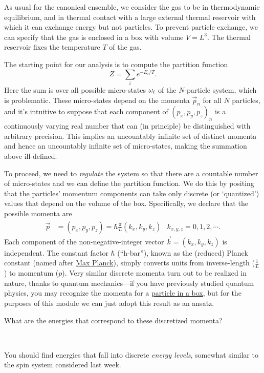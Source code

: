 As usual for the canonical ensemble, we consider the gas to be in thermodynamic equilibrium, and in thermal contact with a large external thermal reservoir with which it can exchange energy but not particles.
To prevent particle exchange, we can specify that the gas is enclosed in a box with volume $V = L^3$.
The thermal reservoir fixes the temperature $T$ of the gas.

The starting point for our analysis is to compute the partition function
\begin{equation*}
  Z = \sum_i e^{-E_i / T}.
\end{equation*}
Here the sum is over all possible micro-states $\omega_i$ of the $N$-particle system, which is problematic.
These micro-states depend on the momenta $\vec{p}_n$ for all $N$ particles, and it's intuitive to suppose that each component of $(p_x, p_y, p_z)_n$ is a continuously varying real number that can (in principle) be distinguished with arbitrary precision.
This implies an uncountably infinite set of distinct momenta and hence an uncountably infinite set of micro-states, making the summation above ill-defined.

To proceed, we need to \textit{regulate} the system so that there are a countable number of micro-states and we can define the partition function.
We do this by positing that the particles' momentum components can take only discrete (or `quantized') values that depend on the volume of the box.
Specifically, we declare that the possible momenta are
\begin{align}
  \label{eq:quant_mom}
  \vec p & = (p_x, p_y, p_z) = \hbar \frac{\pi}{L} (k_x, k_y, k_z) &
  k_{x, y, z} = 0, 1, 2, \cdots.
\end{align}
Each component of the non-negative-integer vector $\vec k = (k_x, k_y, k_z)$ is independent.
The constant factor $\hbar$ (``h-bar''), known as the (reduced) Planck constant (named after \href{https://en.wikipedia.org/wiki/Max_Planck}{Max Planck}), simply converts units from inverse-length ($\frac{1}{L}$) to momentum ($p$).
Very similar discrete momenta turn out to be realized in nature, thanks to quantum mechanics---if you have previously studied quantum physics, you may recognize the momenta for a \href{https://en.wikipedia.org/wiki/Particle_in_a_box}{particle in a box}, but for the purposes of this module we can just adopt this result as an ansatz.

What are the energies that correspond to these discretized momenta?
\begin{mdframed}
  \ \\[50 pt]
\end{mdframed}
You should find energies that fall into discrete \textit{energy levels}, somewhat similar to the spin system considered last week.

